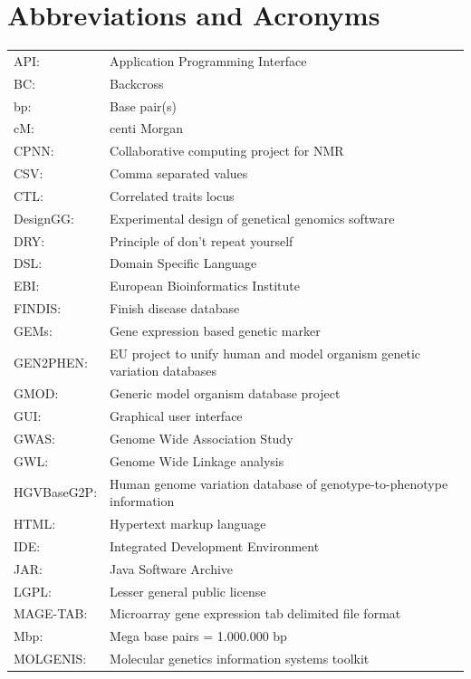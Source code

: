 \section*{Abbreviations and Acronyms}
{\footnotesize
\begin{tabular}{ l l }
API:         & Application Programming Interface\\
BC:          & Backcross \\
bp:          & Base pair(s) \\
cM:          & centi Morgan \\
CPNN:        & Collaborative computing project for NMR\\
CSV:         & Comma separated values\\
CTL:         & Correlated traits locus \\
DesignGG:    & Experimental design of genetical genomics software\\
DRY:         & Principle of don't repeat yourself\\
DSL:         & Domain Specific Language\\
EBI:         & European Bioinformatics Institute\\
FINDIS:      & Finish disease database\\
GEMs:        & Gene expression based genetic marker\\
GEN2PHEN:    & EU project to unify human and model organism genetic variation databases\\
GMOD:        & Generic model organism database project\\
GUI:         & Graphical user interface\\
GWAS:        & Genome Wide Association Study\\
GWL:         & Genome Wide Linkage analysis\\
HGVBaseG2P:  & Human genome variation database of genotype-to-phenotype information\\
HTML:        & Hypertext markup language\\
IDE:         & Integrated Development Environment\\
JAR:         & Java Software Archive\\
LGPL:        & Lesser general public license\\
MAGE-TAB:    & Microarray gene expression tab delimited file format\\
Mbp:         & Mega base pairs = 1.000.000 bp \\
MOLGENIS:    & Molecular genetics information systems toolkit\\

\end{tabular}}
